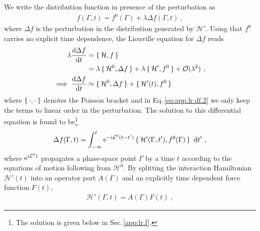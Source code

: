 We write the distribution function in presence of the perturbation as
\begin{align}
  f (\Gamma, t) = f^0(\Gamma) + \lambda \Delta f (\Gamma, t)~,
  \label{eq:app.lr.f}
\end{align}
where $\Delta f$ is the perturbation in the distribution generated by $\mathcal  H'$. Using that $f^0$ carries no explicit time dependence, the Liouville equation for $\Delta f$ reads
\begin{align}
  \lambda \frac{\d \Delta f}{\d t}
    &= \set{\mathcal  H, f} \nonumber \\
    &= \lambda \set{\mathcal H^0, \Delta f} 
      + \lambda \set{\mathcal H', f^0}
      + \mathcal{O}(\lambda^2)~,
  \label{eq:app.lr.df.1} \\
  \implies
    \frac{\d \Delta f}{\d t}
      &\approx \set{\mathcal H^0 , \Delta f} + \set{\mathcal H' (t), f^0}
  \label{eq:app.lr.df.2}
\end{align}
where $\set{\cdot , \cdot}$ denotes the Poisson bracket
and in Eq.\,\eqref{eq:app.lr.df.2} we only keep the terms to linear order in the perturbation.
The solution to this differential equation is found to be\footnote{The solution is given below in Sec.\,\ref{app:lr.f}.}~\cite{Kubo1957a}
\begin{align}
  \Delta f (\Gamma, t) 
    = \int_{-\infty}^t {\rm e}^{-\im \mathcal  L^0 (t - t')} \set{\mathcal  H' (\Gamma, t'), f^0 (\Gamma)}~\d t'~,
  \label{eq:app.lr.df(t)}
\end{align}
where ${\rm e}^{{\rm i} \mathcal  L^0 t}$ propagates a phase-space point $\Gamma$ by a time $t$ according to the equations of motion following from $\mathcal H^0$.
By splitting the interaction Hamiltonian $\mathcal H'(t)$ into an operator part $ A(\Gamma)$ and an explicitly time dependent force function $F(t)$,
\begin{align}
  \mathcal H' (\Gamma, t)= A (\Gamma) F(t)~,
  \label{eq:app.lr.H_AF}
\end{align}

